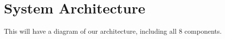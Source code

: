 \section{System Architecture}

This will have a diagram of our architecture, including all 8 components.